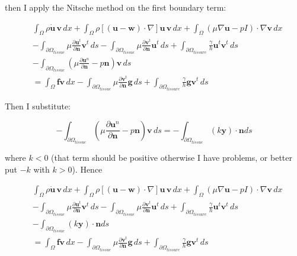 \documentclass[11pt,a4paper,titlepage]{report}
\begin{document}
then I apply the Nitsche method on the first boundary term: 

\begin{align*}
& \int_{\Omega} \rho \dot{\mathbf{u}} \, \mathbf{v} \, dx
+ \int_{\Omega} \rho [(\mathbf{u - w}) \cdot \nabla] \mathbf{u} \, \mathbf{v} \, dx
+ \int_{\Omega} (\mu \nabla \mathbf{u} - pI) \cdot \nabla \mathbf{v} \, dx \\
& - \int_{\partial \Omega_{tissue}} \mu \frac{\partial \mathbf{u}^t}{\partial \mathbf{n}} \mathbf{v}^t \, ds 
- \int_{\partial \Omega_{tissue}} \mu \frac{\partial \mathbf{v}^t}{\partial \mathbf{n}} \mathbf{u}^t \, ds 
+ \int_{\partial \Omega_{tissure}} \frac{\gamma}{h} \mathbf{u}^t \mathbf{v}^t \, ds \\
& - \int_{\partial \Omega_{tissue}} ( \mu \frac{\partial \mathbf{u}^n}{\partial \mathbf{n}} - p \mathbf{n} ) \mathbf{v} \, ds \\
& =  \int_{\Omega} \mathbf{f} \mathbf{v} \, dx
- \int_{\partial \Omega_{tissue}} \mu \frac{\partial \mathbf{v}^t}{\partial \mathbf{n}} \mathbf{g} \, ds 
+ \int_{\partial \Omega_{tissure}} \frac{\gamma}{h} \mathbf{g} \mathbf{v}^t \, ds
\end{align*}


Then I substitute:

\[
- \int_{\partial \Omega_{tissue}} ( \mu \frac{\partial \mathbf{u}^n}{\partial \mathbf{n}} - p \mathbf{n} ) \mathbf{v} \, ds
= - \int_{\partial \Omega_{tissue}} (k \mathbf{y}) \cdot \mathbf{n} ds 
\]

where $k < 0$ (that term should be positive otherwise I have problems, or better put $-k$ with $k>0$). Hence

\begin{align*}
& \int_{\Omega} \rho \dot{\mathbf{u}} \, \mathbf{v} \, dx
+ \int_{\Omega} \rho [(\mathbf{u - w}) \cdot \nabla] \mathbf{u} \, \mathbf{v} \, dx
+ \int_{\Omega} (\mu \nabla \mathbf{u} - pI) \cdot \nabla \mathbf{v} \, dx \\
& - \int_{\partial \Omega_{tissue}} \mu \frac{\partial \mathbf{u}^t}{\partial \mathbf{n}} \mathbf{v}^t \, ds 
- \int_{\partial \Omega_{tissue}} \mu \frac{\partial \mathbf{v}^t}{\partial \mathbf{n}} \mathbf{u}^t \, ds 
+ \int_{\partial \Omega_{tissure}} \frac{\gamma}{h} \mathbf{u}^t \mathbf{v}^t \, ds \\
& - \int_{\partial \Omega_{tissue}} (k \mathbf{y}) \cdot \mathbf{n} ds  \\
& = \int_{\Omega} \mathbf{f} \mathbf{v} \, dx
- \int_{\partial \Omega_{tissue}} \mu \frac{\partial \mathbf{v}^t}{\partial \mathbf{n}} \mathbf{g} \, ds 
+ \int_{\partial \Omega_{tissure}} \frac{\gamma}{h} \mathbf{g} \mathbf{v}^t \, ds
\end{align*}
\end{document}
